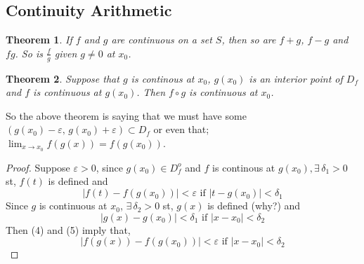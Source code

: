 \documentclass{article}
\newcommand{\sub}{\subset}
\renewcommand{\d}{\delta}
\newcommand{\e}{\varepsilon}
\newcommand{\ex}{\exists\,}
\theoremstyle{mythmstyle}
\newtheorem{theorem}{Theorem}[subsection]
\begin{document}
\subsection{Continuity Arithmetic}
\begin{theorem}
  If $f$ and $g$ are continuous on a set $S$, then so are $f + g$, $f - g$ and $fg$. So is $\displaystyle{\frac{f}{g}}$ given $g\neq 0$ at $x_0$.
\end{theorem}

\begin{theorem}
  Suppose that $g$ is continous at $x_0$, $g(x_0)$ is an interior point of $D_f$ and $f$ is continuous at $g(x_0)$. Then $f\circ g$ is continuous at $x_0$.
\end{theorem}
\begin{figure}[H]
  \centering
\end{figure}

So the above theorem is saying that we must have some $(g(x_0) - \e,\, g(x_0) + \e) \sub D_f$ or even that; $\displaystyle{\lim_{x\to x_0}{f(g(x))} = f(g(x_0))}$.

\begin{proof}
  Suppose $\e>0$, since $g(x_0)\in D_f^o$ and $f$ is continous at $g(x_0), \ex\d_1>0$ st, $f(t)$ is defined and
  \begin{equation}
    |f(t) - f(g(x_0))|<\e \text{ if } |t - g(x_0)| < \d_1
  \end{equation}
  Since $g$ is continuous at $x_0$, $\ex\d_2>0$ st, $g(x)$ is defined (why?) and
  \begin{equation}
    |g(x) - g(x_0)| < \d_1 \text{ if } |x - x_0|<\d_2
  \end{equation}
  Then (4) and (5) imply that,
  $$ |f(g(x)) - f(g(x_0))| < \e \text{ if } |x - x_0| < \d_2 $$

\end{proof}
\end{document}
